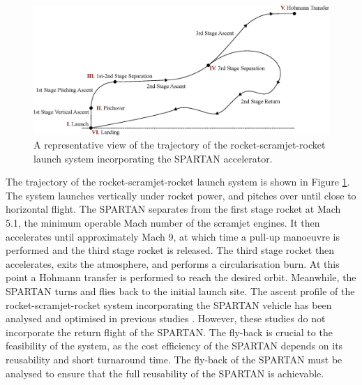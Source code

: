 \documentclass[journal]{new-aiaa} %
\begin{document}
\begin{figure}
\centering
\includegraphics[width=0.9\linewidth]{Figures/Traj}
\caption{A representative view of the trajectory of the rocket-scramjet-rocket launch system incorporating the SPARTAN accelerator.}
\label{fig:Traj}
\end{figure}


The trajectory of the rocket-scramjet-rocket launch system is shown in Figure \ref{fig:Traj}. The system launches vertically under rocket power, and pitches over until close to horizontal flight. The SPARTAN separates from the first stage rocket at Mach 5.1, the minimum operable Mach number of the scramjet engines. It then accelerates until approximately Mach 9, at which time a pull-up manoeuvre is performed and the third stage rocket is released. The third stage rocket then accelerates, exits the atmosphere, and performs a circularisation burn. At this point a Hohmann transfer is performed to reach the desired orbit. Meanwhile, the SPARTAN turns and flies back to the initial launch site.
The ascent profile of the rocket-scramjet-rocket system incorporating the SPARTAN vehicle has been analysed and optimised in previous studies \cite{Preller2017,ForbesSpyratos2018}. However, these studies do not incorporate the return flight of the SPARTAN. The fly-back is crucial to the feasibility of the system, as the cost efficiency of the SPARTAN depends on its reusability and short turnaround time.
The fly-back of the SPARTAN must be analysed to ensure that the full reusability of the SPARTAN is achievable. 
\end{document}
